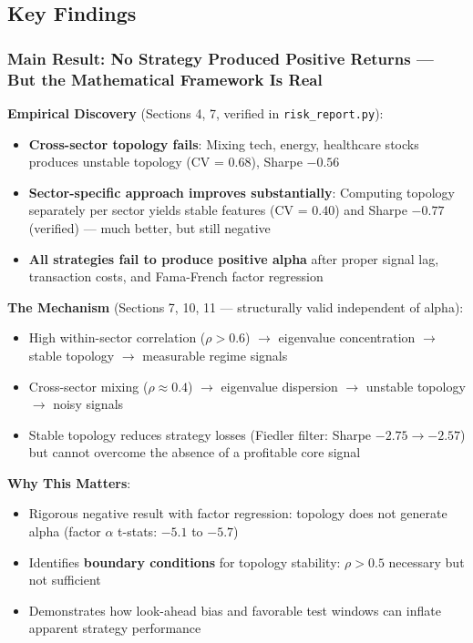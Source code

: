 \subsection{Key Findings}

\subsubsection{Main Result: No Strategy Produced Positive Returns — But the Mathematical Framework Is Real}

\textbf{Empirical Discovery} (Sections 4, 7, verified in \texttt{risk\_report.py}):
\begin{itemize}
\item \textbf{Cross-sector topology fails}: Mixing tech, energy, healthcare stocks produces unstable topology (CV = 0.68), Sharpe $-0.56$
\item \textbf{Sector-specific approach improves substantially}: Computing topology separately per sector yields stable features (CV = 0.40) and Sharpe $-0.77$ (verified) --- much better, but still negative
\item \textbf{All strategies fail to produce positive alpha} after proper signal lag, transaction costs, and Fama-French factor regression
\end{itemize}

\textbf{The Mechanism} (Sections 7, 10, 11 — structurally valid independent of alpha):
\begin{itemize}
\item High within-sector correlation ($\rho > 0.6$) $\rightarrow$ eigenvalue concentration $\rightarrow$ stable topology $\rightarrow$ measurable regime signals
\item Cross-sector mixing ($\rho \approx 0.4$) $\rightarrow$ eigenvalue dispersion $\rightarrow$ unstable topology $\rightarrow$ noisy signals
\item Stable topology reduces strategy losses (Fiedler filter: Sharpe $-2.75 \rightarrow -2.57$) but cannot overcome the absence of a profitable core signal
\end{itemize}

\textbf{Why This Matters}:
\begin{itemize}
\item Rigorous negative result with factor regression: topology does not generate alpha (factor $\alpha$ t-stats: $-5.1$ to $-5.7$)
\item Identifies \textbf{boundary conditions} for topology stability: $\rho > 0.5$ necessary but not sufficient
\item Demonstrates how look-ahead bias and favorable test windows can inflate apparent strategy performance
\end{itemize}

